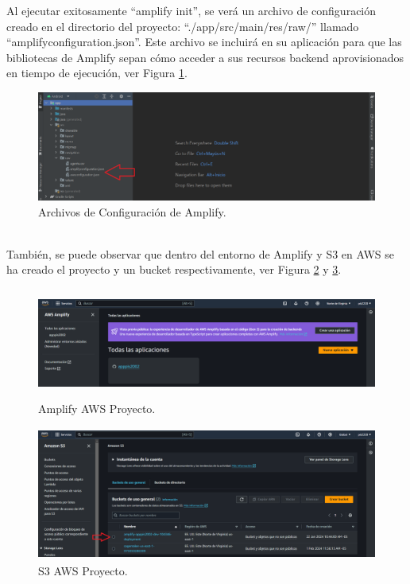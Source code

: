 \documentclass[a4paper,10pt, oneside, titlepage]{article}
\begin{document}
	\indent Al ejecutar exitosamente ``amplify init'', se verá un archivo de configuración creado en el directorio del proyecto: ``./app/src/main/res/raw/'' llamado ``amplifyconfiguration.json''. Este archivo se incluirá en su aplicación para que las bibliotecas de Amplify sepan cómo acceder a sus recursos backend aprovisionados en tiempo de ejecución, ver Figura \ref{Amplify_JSON}.
	\begin{figure}[!h]
		\centering
		\includegraphics[width = 1\linewidth, height = 3.6cm]{Amplify_JSON.png}
		\caption{Archivos de Configuración de Amplify.}
		\label{Amplify_JSON}
	\end{figure} \\
	\indent También, se puede observar que dentro del entorno de Amplify y S3 en AWS se ha creado el proyecto y un bucket respectivamente, ver Figura \ref{Amplify_AWS_Proyecto} y \ref{S3_AWS_Proyecto}.
	\begin{figure}[!h]
		\centering
		\includegraphics[width = 1\linewidth, height = 3.6cm]{Amplify_AWS_Proyecto.png}
		\caption{Amplify AWS Proyecto.}
		\label{Amplify_AWS_Proyecto}
	\end{figure} 
	\begin{figure}[!h]
		\centering
		\includegraphics[width = 1\linewidth, height = 4.4cm]{S3_AWS_Proyecto.png}
		\caption{S3 AWS Proyecto.}
		\label{S3_AWS_Proyecto}
	\end{figure} \\
\end{document}
